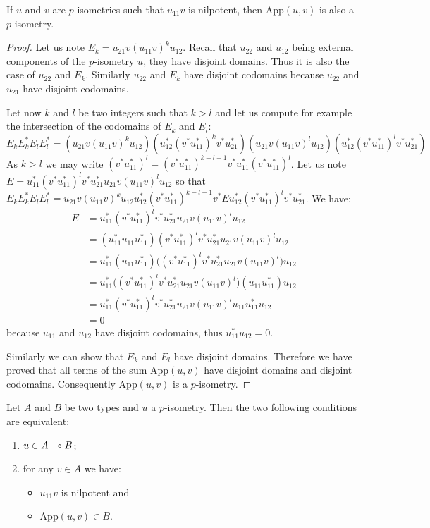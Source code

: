 \begin{theorem}
If $u$ and $v$ are $p$-isometries such that $u_{11}v$ is nilpotent, then $\mathrm{App}(u,v)$ is also a $p$-isometry.
\end{theorem}

\begin{proof}
Let us note $E_k = u_{21}v(u_{11}v)^ku_{12}$. Recall that $u_{22}$ and $u_{12}$ being external components of the $p$-isometry $u$, they have disjoint domains. Thus it is also the case of $u_{22}$ and $E_k$. Similarly $u_{22}$ and $E_k$ have disjoint codomains because $u_{22}$ and $u_{21}$ have disjoint codomains.

Let now $k$ and $l$ be two integers such that $k>l$ and let us compute for example the intersection of the codomains of $E_k$ and $E_l$:
\begin{equation*}
    E_kE^*_kE_lE^*_l = (u_{21}v(u_{11}v)^ku_{12})(u^*_{12}(v^*u^*_{11})^kv^*u^*_{21})(u_{21}v(u_{11}v)^lu_{12})(u^*_{12}(v^*u^*_{11})^lv^*u_{21}^*)
\end{equation*}
  As $k>l$ we may write $(v^*u_{11}^*)^l = (v^*u^*_{11})^{k-l-1}v^*u^*_{11}(v^*u^*_{11})^l$. Let us note $E = u^*_{11}(v^*u^*_{11})^lv^*u_{21}^*u_{21}v(u_{11}v)^lu_{12}$ so that $E_kE^*_kE_lE^*_l = u_{21}v(u_{11}v)^ku_{12}u^*_{12}(v^*u^*_{11})^{k-l-1}v^*Eu^*_{12}(v^*u^*_{11})^lv^*u_{21}^*$. We have:
\begin{align*}
     E & = u^*_{11}(v^*u^*_{11})^lv^*u_{21}^*u_{21}v(u_{11}v)^lu_{12}\\
       & = (u^*_{11}u_{11}u^*_{11})(v^*u^*_{11})^lv^*u_{21}^*u_{21}v(u_{11}v)^lu_{12}\\
       & = u^*_{11}(u_{11}u^*_{11})\bigl((v^*u^*_{11})^lv^*u_{21}^*u_{21}v(u_{11}v)^l\bigr)u_{12}\\
       & = u^*_{11}\bigl((v^*u^*_{11})^lv^*u_{21}^*u_{21}v(u_{11}v)^l\bigr)(u_{11}u^*_{11})u_{12}\\
       & = u^*_{11}(v^*u^*_{11})^lv^*u_{21}^*u_{21}v(u_{11}v)^lu_{11}u^*_{11}u_{12}\\
       & = 0
\end{align*}
because $u_{11}$ and $u_{12}$ have disjoint codomains, thus $u^*_{11}u_{12} = 0$. 

Similarly we can show that $E_k$ and $E_l$ have disjoint domains. Therefore we have proved that all terms of the sum $\mathrm{App}(u,v)$ have disjoint domains and disjoint codomains. Consequently $\mathrm{App}(u,v)$ is a $p$-isometry.
\end{proof}

\begin{theorem}
Let $A$ and $B$ be two types and $u$ a $p$-isometry. Then the two following conditions are equivalent:
\begin{enumerate}
\item $u\in A\multimap B$;
\item for any $v\in A$ we have:
  \begin{itemize}
  \item $u_{11}v$ is nilpotent and
  \item $\mathrm{App}(u, v)\in B$.
  \end{itemize}
\end{enumerate}
\end{theorem}

